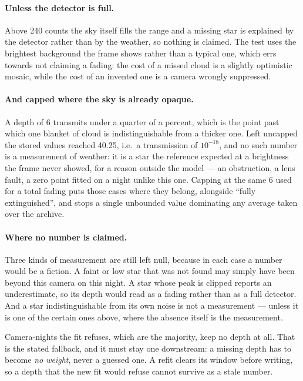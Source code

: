 \documentclass[11pt,a4paper]{article}
\begin{document}
\paragraph{Unless the detector is full.} Above \num{240} counts the sky itself
fills the range and a missing star is explained by the detector rather than by
the weather, so nothing is claimed. The test uses the brightest background the
frame shows rather than a typical one, which errs towards not claiming a fading:
the cost of a missed cloud is a slightly optimistic mosaic, while the cost of an
invented one is a camera wrongly suppressed.

\paragraph{And capped where the sky is already opaque.} A depth of 6 transmits
under a quarter of a percent, which is the point past which one blanket of
cloud is indistinguishable from a thicker one. Left uncapped the stored values
reached \num{40.25}, i.e.\ a transmission of $10^{-18}$, and no such number is
a measurement of weather: it is a star the reference expected at a brightness
the frame never showed, for a reason outside the model --- an obstruction, a
lens fault, a zero point fitted on a night unlike this one. Capping at the same
6 used for a total fading puts those cases where they belong, alongside ``fully
extinguished'', and stops a single unbounded value dominating any average taken
over the archive.

\paragraph{Where no number is claimed.} Three kinds of measurement are still
left null, because in each case a number would be a fiction. A faint or low star
that was not found may simply have been beyond this camera on this night. A star
whose peak is clipped reports an underestimate, so its depth would read as a
fading rather than as a full detector. And a star indistinguishable from its own
noise is not a measurement --- unless it is one of the certain ones above, where
the absence itself is the measurement.

Camera-nights the fit refuses, which are the majority, keep no depth at all.
That is the stated fallback, and it must stay one downstream: a missing depth
has to become \emph{no weight}, never a guessed one. A refit clears its window
before writing, so a depth that the new fit would refuse cannot survive as a
stale number.
\end{document}
